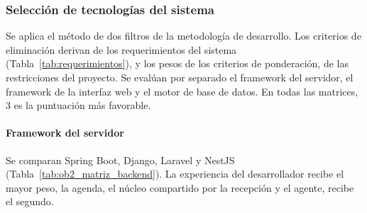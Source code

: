 \subsubsection{Selección de tecnologías del sistema}

Se aplica el método de dos filtros de la metodología de desarrollo. Los criterios de eliminación derivan de los requerimientos del sistema (Tabla~\ref{tab:requerimientos}), y los pesos de los criterios de ponderación, de las restricciones del proyecto. Se evalúan por separado el framework del servidor, el framework de la interfaz web y el motor de base de datos. En todas las matrices, 3 es la puntuación más favorable.

\paragraph{Framework del servidor}

Se comparan Spring Boot, Django, Laravel y NestJS (Tabla~\ref{tab:ob2_matriz_backend}). La experiencia del desarrollador recibe el mayor peso, la agenda, el núcleo compartido por la recepción y el agente, recibe el segundo.


